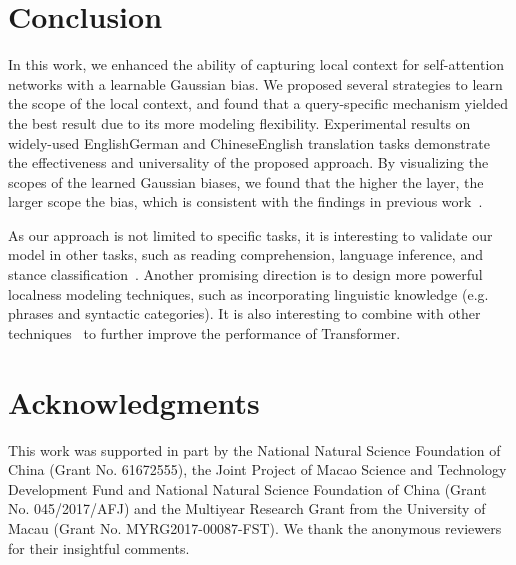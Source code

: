 \documentclass[11pt,a4paper]{article}
\begin{document}
\section{Conclusion}

In this work, we enhanced the ability of capturing local context for self-attention networks with a learnable Gaussian bias. We proposed several strategies to learn the scope of the local context, and found that a query-specific mechanism yielded the best result due to its more modeling flexibility.
Experimental results on widely-used EnglishGerman and ChineseEnglish translation tasks demonstrate the effectiveness and universality of the proposed approach.
By visualizing the scopes of the learned Gaussian biases, we found that the higher the layer, the larger scope the bias, which is consistent with the findings in previous work~\cite{shi2016does,Peters:2018:NAACL}.

As our approach is not limited to specific tasks, it is interesting to validate our model in other tasks, such as reading comprehension, language inference, and stance classification~\cite{Xu:2018:ACL}.
Another promising direction is to design more powerful localness modeling techniques, such as incorporating linguistic knowledge (e.g. phrases and syntactic categories).
It is also interesting to combine with other techniques~\cite{shaw2018self,Shen:2018:AAAI,Dou:2018:EMNLP,Li:2018:EMNLP} to further improve the performance of Transformer.


\section*{Acknowledgments}
This work was supported in part by the National Natural Science Foundation of China (Grant No. 61672555), the Joint Project of Macao Science and Technology Development Fund and National Natural Science Foundation of China (Grant No. 045/2017/AFJ) and the Multiyear Research Grant from the University of Macau (Grant No. MYRG2017-00087-FST).
We thank the anonymous reviewers for their insightful comments.


\balance


\end{document}
